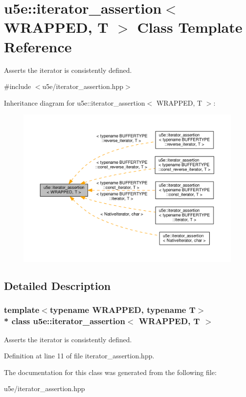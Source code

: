 \hypertarget{classu5e_1_1iterator__assertion}{}\section{u5e\+:\+:iterator\+\_\+assertion$<$ W\+R\+A\+P\+P\+ED, T $>$ Class Template Reference}
\label{classu5e_1_1iterator__assertion}


Asserts the iterator is consistently defined.  




{\ttfamily \#include $<$u5e/iterator\+\_\+assertion.\+hpp$>$}



Inheritance diagram for u5e\+:\+:iterator\+\_\+assertion$<$ W\+R\+A\+P\+P\+ED, T $>$\+:
\nopagebreak
\begin{figure}[H]
\begin{center}
\leavevmode
\includegraphics[width=350pt]{classu5e_1_1iterator__assertion__inherit__graph}
\end{center}
\end{figure}


\subsection{Detailed Description}
\subsubsection*{template$<$typename W\+R\+A\+P\+P\+ED, typename T$>$\\*
class u5e\+::iterator\+\_\+assertion$<$ W\+R\+A\+P\+P\+E\+D, T $>$}

Asserts the iterator is consistently defined. 

Definition at line 11 of file iterator\+\_\+assertion.\+hpp.



The documentation for this class was generated from the following file\+:\begin{DoxyCompactItemize}
\item 
u5e/iterator\+\_\+assertion.\+hpp\end{DoxyCompactItemize}
